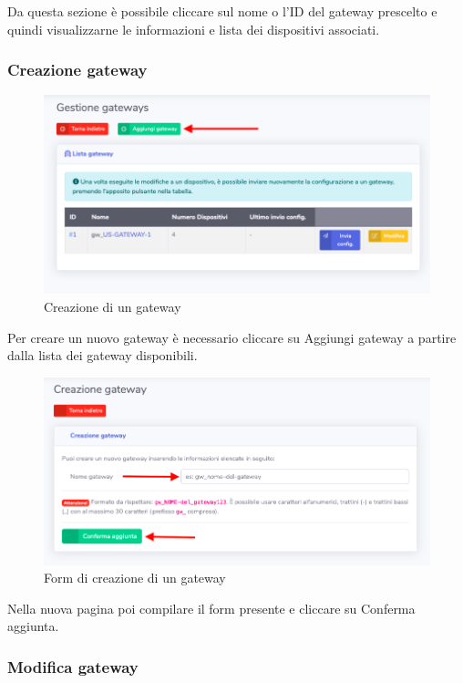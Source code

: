		Da questa sezione è possibile cliccare sul nome o l'ID del gateway prescelto e quindi visualizzarne le informazioni e lista dei dispositivi associati.

	\subsubsection{Creazione gateway}

		\begin{figure}[H]
		\centering
		\includegraphics[scale=0.600]{res/images/admin/selCreazGateway.png}
		\caption{Creazione di un gateway}
	\end{figure}


		Per creare un nuovo gateway è necessario cliccare su Aggiungi gateway a partire dalla lista dei gateway disponibili.

		\begin{figure}[H]
		\centering
		\includegraphics[scale=0.600]{res/images/admin/creazGateway.png}
		\caption{Form di creazione di un gateway}
	\end{figure}


		Nella nuova pagina poi compilare il form presente e cliccare su Conferma aggiunta. 

	\subsubsection{Modifica gateway}

